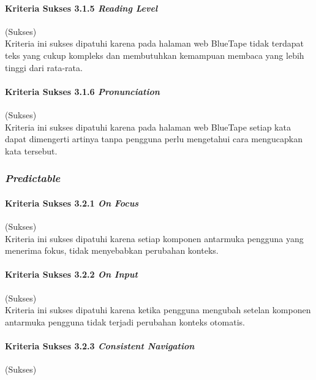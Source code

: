 \paragraph{Kriteria Sukses 3.1.5 \textit{Reading Level}}
\label{par:kepatuhan_bluetape_kriteria_sukses_3.1.5}
(Sukses)\\

Kriteria ini sukses dipatuhi karena pada halaman web BlueTape tidak terdapat teks yang cukup kompleks dan membutuhkan kemampuan membaca yang lebih tinggi dari rata-rata.

\paragraph{Kriteria Sukses 3.1.6 \textit{Pronunciation}}
\label{par:kepatuhan_bluetape_kriteria_sukses_3.1.6}
(Sukses)\\

Kriteria ini sukses dipatuhi karena pada halaman web BlueTape setiap kata dapat dimengerti artinya tanpa pengguna perlu mengetahui cara mengucapkan kata tersebut.

\subsubsection{\textit{Predictable}}
\label{subsubsec:kepatuhan_bluetape_predictable}

\paragraph{Kriteria Sukses 3.2.1 \textit{On Focus}}
\label{par:kepatuhan_bluetape_kriteria_sukses_3.2.1}
(Sukses)\\

Kriteria ini sukses dipatuhi karena setiap komponen antarmuka pengguna yang menerima fokus, tidak menyebabkan perubahan konteks.

\paragraph{Kriteria Sukses 3.2.2 \textit{On Input}}
\label{par:kepatuhan_bluetape_kriteria_sukses_3.2.2}
(Sukses)\\

Kriteria ini sukses dipatuhi karena ketika pengguna mengubah setelan komponen antarmuka pengguna tidak terjadi perubahan konteks otomatis.

\paragraph{Kriteria Sukses 3.2.3 \textit{Consistent Navigation}}
\label{par:kepatuhan_bluetape_kriteria_sukses_3.2.3}
(Sukses)\\

